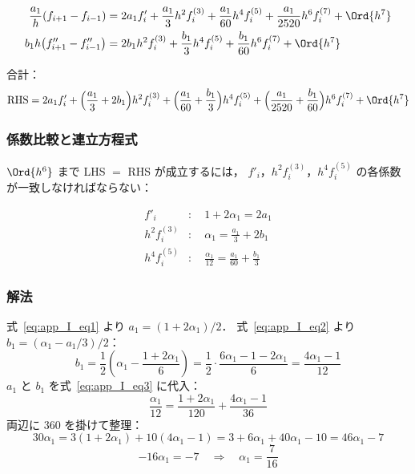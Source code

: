 \begin{align}
  \frac{a_1}{h}(f_{i+1}-f_{i-1})
  &= 2a_1 f'_i + \frac{a_1}{3}h^2 f^{(3)}_i + \frac{a_1}{60}h^4 f^{(5)}_i
     + \frac{a_1}{2520}h^6 f^{(7)}_i + \Ord{h^7} \\
  b_1 h\bigl(f''_{i+1}-f''_{i-1}\bigr)
  &= 2b_1 h^2 f^{(3)}_i + \frac{b_1}{3}h^4 f^{(5)}_i
     + \frac{b_1}{60}h^6 f^{(7)}_i + \Ord{h^7}
\end{align}

合計：
\begin{equation}
  \text{RHS} = 2a_1 f'_i
  + \Bigl(\frac{a_1}{3} + 2b_1\Bigr)h^2 f^{(3)}_i
  + \Bigl(\frac{a_1}{60} + \frac{b_1}{3}\Bigr)h^4 f^{(5)}_i
  + \Bigl(\frac{a_1}{2520} + \frac{b_1}{60}\Bigr)h^6 f^{(7)}_i + \Ord{h^7}
\end{equation}

\subsubsection*{係数比較と連立方程式}

$\Ord{h^6}$ まで LHS $=$ RHS が成立するには，
$f'_i$，$h^2 f^{(3)}_i$，$h^4 f^{(5)}_i$ の各係数が一致しなければならない：

\begin{align}
  f'_i       &:\quad 1 + 2\alpha_1 = 2a_1 \label{eq:app_I_eq1} \\
  h^2 f^{(3)}_i &:\quad \alpha_1 = \frac{a_1}{3} + 2b_1 \label{eq:app_I_eq2} \\
  h^4 f^{(5)}_i &:\quad \frac{\alpha_1}{12} = \frac{a_1}{60} + \frac{b_1}{3} \label{eq:app_I_eq3}
\end{align}

\subsubsection*{解法}

式~\eqref{eq:app_I_eq1} より $a_1 = (1+2\alpha_1)/2$．
式~\eqref{eq:app_I_eq2} より $b_1 = (\alpha_1 - a_1/3)/2$：
\[
  b_1 = \frac{1}{2}\!\left(\alpha_1 - \frac{1+2\alpha_1}{6}\right)
      = \frac{1}{2}\cdot\frac{6\alpha_1 - 1 - 2\alpha_1}{6}
      = \frac{4\alpha_1 - 1}{12}
\]
$a_1$ と $b_1$ を式~\eqref{eq:app_I_eq3} に代入：
\[
  \frac{\alpha_1}{12}
  = \frac{1+2\alpha_1}{120} + \frac{4\alpha_1-1}{36}
\]
両辺に $360$ を掛けて整理：
\[
  30\alpha_1 = 3(1+2\alpha_1) + 10(4\alpha_1-1)
             = 3 + 6\alpha_1 + 40\alpha_1 - 10
             = 46\alpha_1 - 7
\]
\[
  -16\alpha_1 = -7
  \quad\Longrightarrow\quad
  \alpha_1 = \frac{7}{16}
\]

